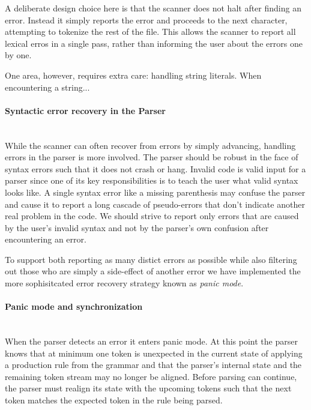 A deliberate design choice here is that the scanner does not halt after finding an error. Instead it simply reports the error and
proceeds to the next character, attempting to tokenize the rest of the file. This allows the scanner to report all
lexical erros in a single pass, rather than informing the user about the errors one by one.


One area, however, requires extra care: handling string literals. 
When encountering a string...


\paragraph{Syntactic error recovery in the Parser}\mbox{}\\
While the scanner can often recover from errors by simply advancing, handling errors in the parser is more involved.
The parser should be robust in the face of syntax errors such that it does not crash or hang.
Invalid code is valid input for a parser since one of its key responsibilities is to teach the user what
valid syntax looks like.
A single syntax error like a missing parenthesis may confuse the parser and cause it to report a long cascade
of pseudo-errors that don't indicate another real problem in the code. 
We should strive to report only errors that are caused by the user's invalid syntax and not by the parser's own
confusion after encountering an error.

To support both reporting as many distict errors as possible while also filtering out those who are simply a side-effect
of another error we have implemented the more sophisitcated error recovery strategy known as \emph{panic mode}.

\paragraph{Panic mode and synchronization}\mbox{}\\
When the parser detects an error it enters panic mode.
At this point the parser knows that at minimum one token is unexpected in the
current state of applying a production rule from the grammar and that the parser's internal state and the remaining
token stream may no longer be aligned. Before parsing can continue, the parser must realign its state with the upcoming tokens
such that the next token matches the expected token in the rule being parsed.

